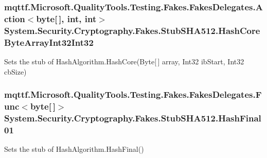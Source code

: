 \hypertarget{class_system_1_1_security_1_1_cryptography_1_1_fakes_1_1_stub_s_h_a512_a502f629be23319c24474ae8a4751fd6c}{
\subsubsection[{Hash\-Core\-Byte\-Array\-Int32\-Int32}]{\setlength{\rightskip}{0pt plus 5cm}mqttf.\-Microsoft.\-Quality\-Tools.\-Testing.\-Fakes.\-Fakes\-Delegates.\-Action$<$byte\mbox{[}$\,$\mbox{]}, int, int$>$ System.\-Security.\-Cryptography.\-Fakes.\-Stub\-S\-H\-A512.\-Hash\-Core\-Byte\-Array\-Int32\-Int32}}\label{class_system_1_1_security_1_1_cryptography_1_1_fakes_1_1_stub_s_h_a512_a502f629be23319c24474ae8a4751fd6c}


Sets the stub of Hash\-Algorithm.\-Hash\-Core(\-Byte\mbox{[}$\,$\mbox{]} array, Int32 ib\-Start, Int32 cb\-Size)

\hypertarget{class_system_1_1_security_1_1_cryptography_1_1_fakes_1_1_stub_s_h_a512_ab9c66df79a4db8283c8bf538c8fa6f10}{
\subsubsection[{Hash\-Final01}]{\setlength{\rightskip}{0pt plus 5cm}mqttf.\-Microsoft.\-Quality\-Tools.\-Testing.\-Fakes.\-Fakes\-Delegates.\-Func$<$byte\mbox{[}$\,$\mbox{]}$>$ System.\-Security.\-Cryptography.\-Fakes.\-Stub\-S\-H\-A512.\-Hash\-Final01}}\label{class_system_1_1_security_1_1_cryptography_1_1_fakes_1_1_stub_s_h_a512_ab9c66df79a4db8283c8bf538c8fa6f10}


Sets the stub of Hash\-Algorithm.\-Hash\-Final()

